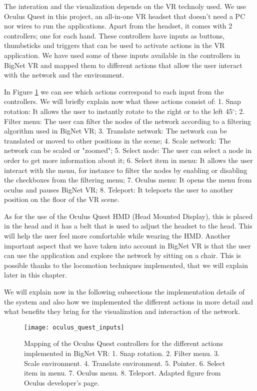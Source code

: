 The interation and the visualization depends on the VR technoly used. We use Oculus Quest in this project, an all-in-one VR headset that doesn't need a PC nor wires to run the applications. Apart from the headset, it comes with 2 controllers; one for each hand. These controllers have inputs as buttons, thumbsticks and triggers that can be used to activate actions in the VR application. We have used some of these inputs available in the controllers in BigNet VR and mapped them to different actions that allow the user interact with the network and the environment.

In Figure \ref{fig:oculus_quest_inputs} we can see which actions correspond to each input from the controllers. We will briefly explain now what these actions consist of: 1. Snap rotation: It allows the user to instantly rotate to the right or to the left 45$^{\circ}$; 2. Filter menu: The user can filter the nodes of the network according to a filtering algorithm used in BigNet VR; 3. Translate network: The network can be translated or moved to other positions in the scene; 4. Scale network: The network can be scaled or "zoomed"; 5. Select node: The user can select a node in order to get more information about it; 6. Select item in menu: It allows the user interact with the menu, for instance to filter the nodes by enabling or disabling the checkboxes from the filtering menu; 7. Oculus menu: It opens the menu from oculus and pauses BigNet VR; 8. Teleport: It teleports the user to another position on the floor of the VR scene.

As for the use of the Oculus Quest HMD (Head Mounted Display), this is placed in the head and it has a belt that is used to adjust the headset to the head. This will help the user feel more comfortable while wearing the HMD. Another important aspect that we have taken into account in BigNet VR is that the user can use the application and explore the network by sitting on a chair. This is possible thanks to the locomotion techniques implemented, that we will explain later in this chapter.

We will explain now in the following subsections the implementation details of the system and also how we implemented the different actions in more detail and what benefits they bring for the visualization and interaction of the network.

\begin{figure}[h!]
    \centering%
    \texttt{[image: oculus\_quest\_inputs]}
    \caption{Mapping of the Oculus Quest controllers for the different actions implemented in BigNet VR: 1. Snap rotation. 2. Filter menu. 3. Scale environment. 4. Translate environment. 5. Pointer. 6. Select item in menu. 7. Oculus menu. 8. Teleport. Adapted figure from Oculus developer's page\cite{oculus_inputs}.}
    \label{fig:oculus_quest_inputs}
\end{figure}%

